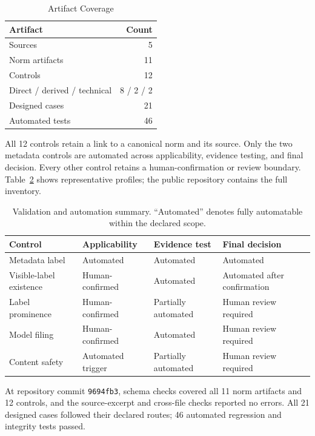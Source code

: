 \documentclass{IOS-Book-Article}
\begin{document}
\begin{table}[t]
\caption{Artifact Coverage}
\label{tab:coverage}
\centering
\footnotesize
\begin{tabular}{@{}lr@{}}
\toprule
\textbf{Artifact} & \textbf{Count} \\
\midrule
Sources & 5 \\
Norm artifacts & 11 \\
Controls & 12 \\
Direct / derived / technical & 8 / 2 / 2 \\
Designed cases & 21 \\
Automated tests & 46 \\
\bottomrule
\end{tabular}
\end{table}

All 12 controls retain a link to a canonical norm and its source. Only the two metadata controls are automated across applicability, evidence testing, and final decision. Every other control retains a human-confirmation or review boundary. Table~\ref{tab:automation} shows representative profiles; the public repository contains the full inventory.

\begin{table}[t]
\caption{Validation and automation summary. ``Automated'' denotes fully automatable within the declared scope.}
\label{tab:automation}
\centering
\footnotesize
\begin{tabularx}{\columnwidth}{@{}p{}p{}p{}X@{}}
\toprule
\textbf{Control} & \textbf{Applicability} & \textbf{Evidence test} & \textbf{Final decision} \\
\midrule
Metadata label & Automated & Automated & Automated \\
Visible-label existence & Human-confirmed & Automated & Automated after confirmation \\
Label prominence & Human-confirmed & Partially automated & Human review required \\
Model filing & Human-confirmed & Automated & Human review required \\
Content safety & Automated trigger & Partially automated & Human review required \\
\bottomrule
\end{tabularx}
\end{table}

At repository commit \texttt{9694fb3}, schema checks covered all 11 norm artifacts and 12 controls, and the source-excerpt and cross-file checks reported no errors. All 21 designed cases followed their declared routes; 46 automated regression and integrity tests passed.
\end{document}
